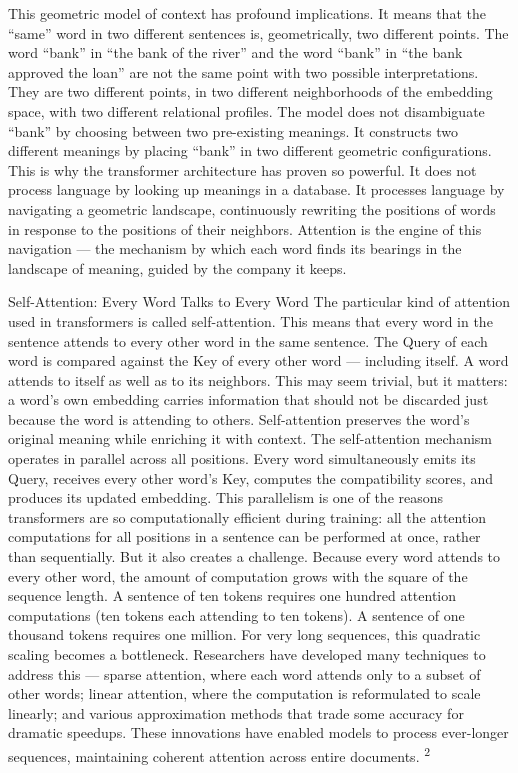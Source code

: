 This geometric model of context has profound implications. It means that the “same” word in two different sentences is, geometrically, two different points. The word “bank” in “the bank of the river” and the word “bank” in “the bank approved the loan” are not the same point with two possible interpretations. They are two different points, in two different neighborhoods of the embedding space, with two different relational profiles. The model does not disambiguate “bank” by choosing between two pre-existing meanings. It constructs two different meanings by placing “bank” in two different geometric configurations. This is why the transformer architecture has proven so powerful. It does not process language by looking up meanings in a database. It processes language by navigating a geometric landscape, continuously rewriting the positions of words in response to the positions of their neighbors. Attention is the engine of this navigation — the mechanism by which each word finds its bearings in the landscape of meaning, guided by the company it keeps.

Self-Attention: Every Word Talks to Every Word The particular kind of attention used in transformers is called self-attention. This means that every word in the sentence attends to every other word in the same sentence. The Query of each word is compared against the Key of every other word — including itself. A word attends to itself as well as to its neighbors. This may seem trivial, but it matters: a word’s own embedding carries information that should not be discarded just because the word is attending to others. Self-attention preserves the word’s original meaning while enriching it with context. The self-attention mechanism operates in parallel across all positions. Every word simultaneously emits its Query, receives every other word’s Key, computes the compatibility scores, and produces its updated embedding. This parallelism is one of the reasons transformers are so computationally efficient during training: all the attention computations for all positions in a sentence can be performed at once, rather than sequentially. But it also creates a challenge. Because every word attends to every other word, the amount of computation grows with the square of the sequence length. A sentence of ten tokens requires one hundred attention computations (ten tokens each attending to ten tokens). A sentence of one thousand tokens requires one million. For very long sequences, this quadratic scaling becomes a bottleneck. Researchers have developed many techniques to address this — sparse attention, where each word attends only to a subset of other words; linear attention, where the computation is reformulated to scale linearly; and various approximation methods that trade some accuracy for dramatic speedups. These innovations have enabled models to process ever-longer sequences, maintaining coherent attention across entire documents. \textsuperscript{2}

